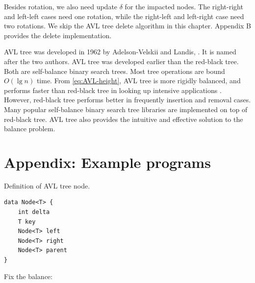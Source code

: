 \documentclass[b5paper]{article}
\begin{document}
Besides rotation, we also need update $\delta$ for the impacted nodes. The right-right and left-left cases need one rotation, while the right-left and left-right case need two rotations. We skip the AVL tree delete algorithm in this chapter. Appendix B provides the delete implementation.

AVL tree was developed in 1962 by Adelson-Velskii and Landis\cite{wiki-avl}, \cite{TFATP}. It is named after the two authors. AVL tree was developed earlier than the red-black tree. Both are self-balance binary search trees. Most tree operations are bound $O(\lg n)$ time. From \cref{eq:AVL-height}, AVL tree is more rigidly balanced, and performs faster than red-black tree in looking up intensive applications \cite{wiki-avl}. However, red-black tree performs better in frequently insertion and removal cases. Many popular self-balance binary search tree libraries are implemented on top of red-black tree. AVL tree also provides the intuitive and effective solution to the balance problem.

\section{Appendix: Example programs}

Definition of AVL tree node.

\begin{lstlisting}[language = Bourbaki]
data Node<T> {
    int delta
    T key
    Node<T> left
    Node<T> right
    Node<T> parent
}
\end{lstlisting}

Fix the balance:
\end{document}
